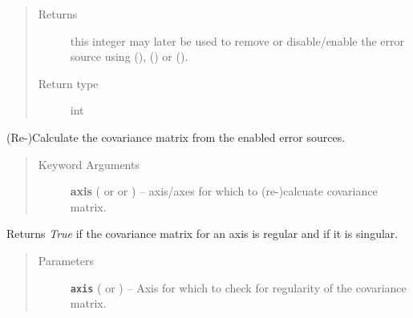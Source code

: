 \documentclass[a4paper,10pt,english]{sphinxmanual}
\begin{document}
\begin{fulllineitems}
\begin{fulllineitems}
\begin{quote}
\begin{description}
\item[{Returns}] \leavevmode
this integer may later be used to remove or disable/enable the
error source using
{\hyperref[module_doc:kafe.dataset.Dataset.remove_error_source]{\emph{}}} (),
{\hyperref[module_doc:kafe.dataset.Dataset.disable_error_source]{\emph{}}} () or
{\hyperref[module_doc:kafe.dataset.Dataset.enable_error_source]{\emph{}}} ().

\item[{Return type}] \leavevmode
int

\end{description}\end{quote}

\end{fulllineitems}


\begin{fulllineitems}
\label{module_doc:kafe.dataset.Dataset.calc_cov_mats}
(Re-)Calculate the covariance matrix from the enabled error sources.
\begin{quote}\begin{description}
\item[{Keyword Arguments}] \leavevmode
\textbf{axis} ( or  or ) --
axis/axes for which to (re-)calcuate covariance matrix.

\end{description}\end{quote}

\end{fulllineitems}


\begin{fulllineitems}
\label{module_doc:kafe.dataset.Dataset.cov_mat_is_regular}
Returns \emph{True} if the covariance matrix for an axis is regular and
 if it is singular.
\begin{quote}\begin{description}
\item[{Parameters}] \leavevmode
\textbf{\texttt{axis}} ( or ) -- Axis for which to check for regularity of the covariance matrix.


\end{description}
\end{quote}
\end{fulllineitems}
\end{fulllineitems}
\end{document}

